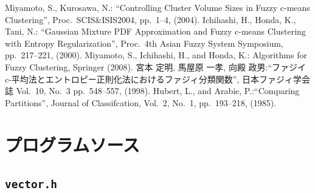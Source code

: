 \documentclass[a4j,12pt,dvipdfmx,oneside]{jsbook}
\theoremstyle{definition}
\begin{document}
%
%
%
%
%
%
\begin{thebibliography}{5}
 Miyamoto, S., Kurosawa, N.: ``Controlling Cluster Volume Sizes in Fuzzy c-means Clustering'', Proc.~SCIS\&ISIS2004, pp.~1--4, (2004).
 Ichihashi, H., Honda, K., Tani, N.: ``Gaussian Mixture PDF Approximation and Fuzzy c-means Clustering with Entropy Regularization'', Proc.~4th Asian Fuzzy System Symposium, pp.~217--221, (2000).
 Miyamoto, S., Ichihashi, H., and Honda, K.: Algorithms for Fuzzy Clustering, Springer (2008).
 宮本 定明, 馬屋原 一孝, 向殿 政男:``ファジイ $c$-平均法とエントロピー正則化法におけるファジィ分類関数'', 日本ファジィ学会誌 Vol.~10, No.~3  pp.~548--557, (1998).
  Hubert, L., and Arabie, P.:``Comparing Partitions'', Journal of Classifcation, Vol.~2, No.~1,
         pp.~193--218, (1985).
\end{thebibliography}
%
\appendix
\pagestyle{headings}
\chapter{プログラムソース}\label{chap:program}
 \section*{\texttt{vector.h}}
\end{document}
